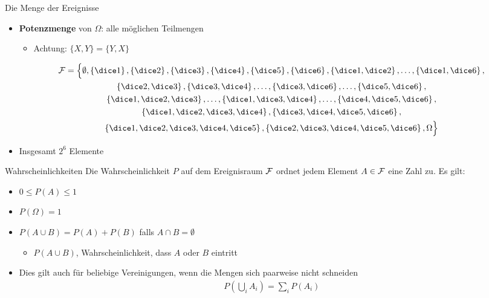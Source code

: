 \begin{frame}{Die Menge der Ereignisse}
  \begin{itemize}
  \item \textbf{Potenzmenge} von $\Omega$: alle möglichen Teilmengen
    \begin{itemize}
    \item Achtung: $\{X,Y\} = \{Y,X\}$
    \end{itemize}
    \begin{multline*}
      \ereignisraum = \Bigl\{\emptyset
      ,\left\{\dice1\right\}
      ,\left\{\dice2\right\}
      ,\left\{\dice3\right\}
      ,\left\{\dice4\right\}
      ,\left\{\dice5\right\}
      ,\left\{\dice6\right\}
      ,\left\{\dice1,\dice2\right\}
      ,\dots
      ,\left\{\dice1,\dice6\right\}
      ,\\\left\{\dice2,\dice3\right\}      
      ,\left\{\dice3,\dice4\right\}
      ,\dots
      ,\left\{\dice3,\dice6\right\}      
      ,\dots
      ,\left\{\dice5,\dice6\right\}
      ,\\\left\{\dice1,\dice2,\dice3\right\}      
      ,\dots
      ,\left\{\dice1,\dice3,\dice4\right\}      
      ,\dots
      ,\left\{\dice4,\dice5,\dice6\right\} 
      ,\\\left\{\dice1,\dice2,\dice3,\dice4\right\}
      ,\left\{\dice3,\dice4,\dice5,\dice6\right\} 
      ,\\\left\{\dice1,\dice2,\dice3,\dice4,\dice5\right\}
      ,\left\{\dice2,\dice3,\dice4,\dice5,\dice6\right\} 
      ,\Omega\Bigr\}
    \end{multline*}
    \item Insgesamt $2^6$ Elemente
  \end{itemize}
\end{frame}

\begin{frame}{Wahrscheinlichkeiten}
  Die Wahrscheinlichkeit $P$ auf dem Ereignisraum $\mathcal F$ ordnet
  jedem Element $A\in \mathcal F$ eine Zahl zu. Es gilt:
  \begin{itemize}
  \item $0 \le P(A) \le 1$
  \item $P(\Omega) = 1$
  \item $P(A\cup B) = P(A)+P(B)$ falls $A\cap B=\emptyset$
    \begin{itemize}
    \item $P(A\cup B)$, Wahrscheinlichkeit, dass $A$ oder $B$ eintritt
    \end{itemize}
    \pause
  \item Dies gilt auch für beliebige Vereinigungen, wenn die Mengen
    sich paarweise nicht schneiden
    \begin{gather*}
      P\left(\bigcup_i A_i\right) = \sum_i P(A_i)
    \end{gather*}
  \end{itemize}
\end{frame}

